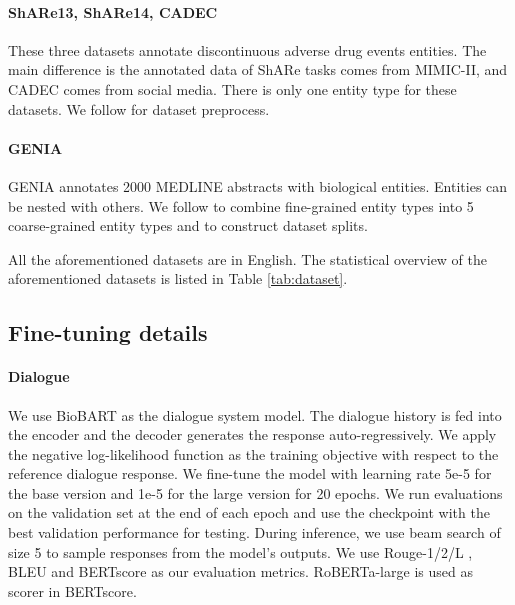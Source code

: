 \documentclass[11pt]{article}
\begin{document}
\paragraph{ShARe13, ShARe14, CADEC}  These three datasets annotate discontinuous adverse drug events entities. The main difference is the annotated data of ShARe tasks \cite{pradhan2013task,mowery2014task} comes from MIMIC-II, and CADEC \cite{karimi2015cadec} comes from social media. There is only one entity type for these datasets. We follow \citet{bartner} for dataset preprocess.

\paragraph{GENIA} \cite{kim2003genia} GENIA annotates 2000 MEDLINE abstracts with biological entities.
Entities can be nested with others. We follow \cite{lin2019sequence} to combine fine-grained entity types into 5 coarse-grained entity types and to construct dataset splits. 

All the aforementioned datasets are in English. The statistical overview of the aforementioned datasets is listed in Table \ref{tab:dataset}.

\subsection{Fine-tuning details}

\paragraph{Dialogue}
We use BioBART as the dialogue system model. The dialogue history is fed into the encoder and the decoder generates the response auto-regressively. We apply the negative log-likelihood function as the training objective with respect to the reference dialogue response. We fine-tune the model with learning rate 5e-5 for the base version and 1e-5 for the large version for 20 epochs. We run evaluations on the validation set at the end of each epoch and use the checkpoint with the best validation performance for testing. During inference, we use beam search of size 5 to sample responses from the model's outputs. We use Rouge-1/2/L \cite{lin-2004-rouge}, BLEU \cite{bleu} and BERTscore \cite{zhang2020bertscore} as our evaluation metrics. RoBERTa-large \cite{Liu2019RoBERTaAR} is used as scorer in BERTscore.
\end{document}
